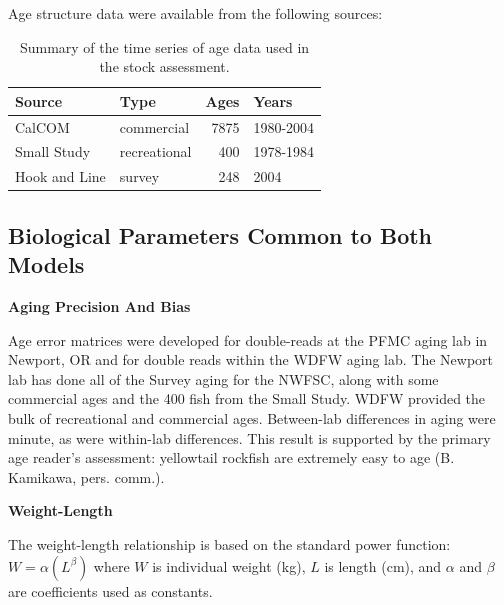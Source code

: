 \documentclass[12pt,]{article}
\begin{document}
Age structure data were available from the following sources:

\vspace{.5cm}

\begin{table}[ht]
\centering
\caption{Summary of the
                                              time series of age data used in the stock
                                              assessment.} 
\label{tab:Age_sources}
\begin{tabular}{llrl}
  \hline
Source & Type & Ages & Years \\ 
  \hline
CalCOM & commercial & 7875 & 1980-2004 \\ 
  Small Study & recreational & 400 & 1978-1984 \\ 
  Hook and Line & survey & 248 & 2004 \\ 
   \hline
\end{tabular}
\end{table}

\clearpage

\subsection{Biological Parameters Common to Both
Models}\label{biological-parameters-common-to-both-models}

\vspace{.5cm}

\textbf{Aging Precision And Bias}

Age error matrices were developed for double-reads at the PFMC aging lab
in Newport, OR and for double reads within the WDFW aging lab. The
Newport lab has done all of the Survey aging for the NWFSC, along with
some commercial ages and the 400 fish from the Small Study. WDFW
provided the bulk of recreational and commercial ages. Between-lab
differences in aging were minute, as were within-lab differences. This
result is supported by the primary age reader's assessment: yellowtail
rockfish are extremely easy to age (B. Kamikawa, pers. comm.).

\vspace{.5cm}

\textbf{Weight-Length}

The weight-length relationship is based on the standard power function:
\(W = \alpha(L^\beta)\) where \(W\) is individual weight (kg), \(L\) is
length (cm), and \(\alpha\) and \(\beta\) are coefficients used as
constants.
\end{document}
